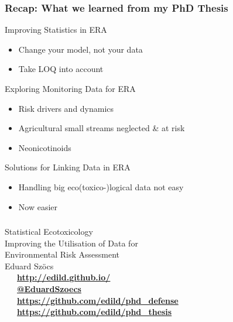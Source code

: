 \documentclass[
	10pt
	]{beamer}
\begin{document}
\begin{frame}
\frametitle{Recap: What we learned from my PhD Thesis}
	\begin{exampleblock}{\checkmark Improving Statistics in ERA}
		\begin{itemize}
			\item Change your model, not your data
			\item Take LOQ into account
		\end{itemize}
	\end{exampleblock}

\pause
	\begin{exampleblock}{\checkmark Exploring Monitoring Data for ERA}
		\begin{itemize}
			\item Risk drivers and dynamics
			\item Agricultural small streams neglected \& at risk
			\item Neonicotinoids
		\end{itemize}
	\end{exampleblock}

\pause
	\begin{exampleblock}{\checkmark Solutions for Linking Data in ERA}
		\begin{itemize}
			\item Handling big eco(toxico-)logical data not easy
			\item Now easier
		\end{itemize}
	\end{exampleblock}
\end{frame}



\begin{frame}[standout]
	\frametitle{}

	\vspace{1em}
	\Huge{Statistical Ecotoxicology} \\[0.3em]
	\large{Improving the Utilisation of Data for \\ Environmental Risk Assessment} \\[1em]

	\normalsize
	Eduard Szöcs \\[3em]

	\faLaptop~~~\textbf{\href{http://edild.github.io/}{http://edild.github.io/ }}\\[.5em]
	\faTwitter~~~\textbf{\href{http://twitter.com/EduardSzoecs}{@EduardSzoecs}} 	\\[0.5em]
	\faFilePowerpointO~~~\textbf{\href{https://github.com/edild/phd_defense}{https://github.com/edild/phd\_defense}}\\[0.5em]
	\faBook~~~\textbf{\href{https://github.com/edild/phd_thesis}{https://github.com/edild/phd\_thesis}}\\[3em]

	\begin{center}\ccbysa\end{center} 

\end{frame}
\end{document}
